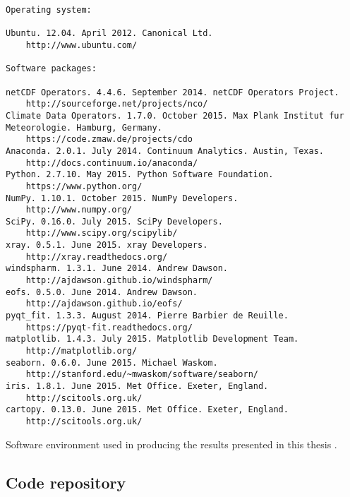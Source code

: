 \begin{featurebox}

\begin{tcolorbox}[width=\textwidth]

\begin{lstlisting}[basicstyle=\footnotesize\ttfamily, breaklines=true]
Operating system: 

Ubuntu. 12.04. April 2012. Canonical Ltd.
    http://www.ubuntu.com/

Software packages:

netCDF Operators. 4.4.6. September 2014. netCDF Operators Project.
    http://sourceforge.net/projects/nco/
Climate Data Operators. 1.7.0. October 2015. Max Plank Institut fur Meteorologie. Hamburg, Germany. 
    https://code.zmaw.de/projects/cdo
Anaconda. 2.0.1. July 2014. Continuum Analytics. Austin, Texas.
    http://docs.continuum.io/anaconda/
Python. 2.7.10. May 2015. Python Software Foundation.
    https://www.python.org/
NumPy. 1.10.1. October 2015. NumPy Developers. 
    http://www.numpy.org/
SciPy. 0.16.0. July 2015. SciPy Developers.
    http://www.scipy.org/scipylib/
xray. 0.5.1. June 2015. xray Developers.
    http://xray.readthedocs.org/
windspharm. 1.3.1. June 2014. Andrew Dawson.
    http://ajdawson.github.io/windspharm/
eofs. 0.5.0. June 2014. Andrew Dawson.
    http://ajdawson.github.io/eofs/
pyqt_fit. 1.3.3. August 2014. Pierre Barbier de Reuille. 
    https://pyqt-fit.readthedocs.org/
matplotlib. 1.4.3. July 2015. Matplotlib Development Team.
    http://matplotlib.org/
seaborn. 0.6.0. June 2015. Michael Waskom.
    http://stanford.edu/~mwaskom/software/seaborn/
iris. 1.8.1. June 2015. Met Office. Exeter, England.
    http://scitools.org.uk/
cartopy. 0.13.0. June 2015. Met Office. Exeter, England.
    http://scitools.org.uk/
\end{lstlisting}

\end{tcolorbox}

\caption{\label{box:software_description}
Software environment used in producing the results presented in this thesis \citep[and documented at][]{IrvingFigshare2016}.}

\end{featurebox}  

\subsection{Code repository}

